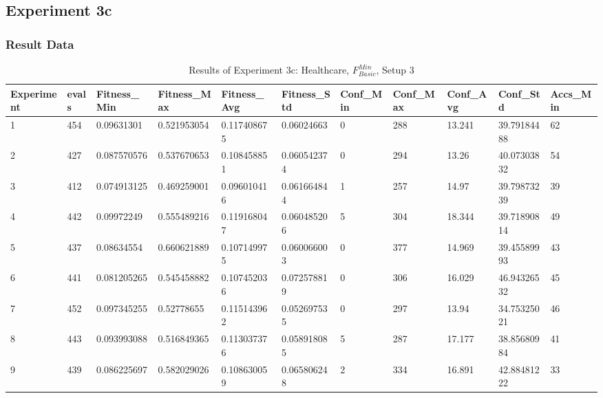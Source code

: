 	\subsection{Experiment 3c}
	\label{sec:A_Exp3c}
		\subsubsection{Result Data}
		\label{sec:A_Exp3c_Data}
		\begin{table}[H]
			\caption{Results of Experiment 3c: Healthcare, $F_{Basic}^{Min}$, Setup 3}
			\label{tab:A_Exp3c_Data}
			\begin{adjustbox}{max width=380pt,keepaspectratio,angle=90}
				\begin{tabular}{|l|l|l|l|l|l|l|l|l|l|l|}
					\hline
					\rowcolor[HTML]{EFEFEF} 
					Experiment & evals & Fitness\_Min & Fitness\_Max & Fitness\_Avg & Fitness\_Std & Conf\_Min & Conf\_Max & Conf\_Avg & Conf\_Std   & Accs\_Min \\ \hline
					1          & 454   & 0.09631301   & 0.521953054  & 0.117408675  & 0.06024663   & 0         & 288       & 13.241    & 39.79184488 & 62        \\ \hline
					2          & 427   & 0.087570576  & 0.537670653  & 0.108458851  & 0.060542374  & 0         & 294       & 13.26     & 40.07303832 & 54        \\ \hline
					3          & 412   & 0.074913125  & 0.469259001  & 0.096010416  & 0.061664844  & 1         & 257       & 14.97     & 39.79873239 & 39        \\ \hline
					4          & 442   & 0.09972249   & 0.555489216  & 0.119168047  & 0.060485206  & 5         & 304       & 18.344    & 39.71890814 & 49        \\ \hline
					5          & 437   & 0.08634554   & 0.660621889  & 0.107149975  & 0.060066003  & 0         & 377       & 14.969    & 39.45589993 & 43        \\ \hline
					6          & 441   & 0.081205265  & 0.545458882  & 0.107452036  & 0.072578819  & 0         & 306       & 16.029    & 46.94326532 & 45        \\ \hline
					7          & 452   & 0.097345255  & 0.52778655   & 0.115143962  & 0.052697535  & 0         & 297       & 13.94     & 34.75325021 & 46        \\ \hline
					8          & 443   & 0.093993088  & 0.516849365  & 0.113037376  & 0.058918085  & 5         & 287       & 17.177    & 38.85680984 & 41        \\ \hline
					9          & 439   & 0.086225697  & 0.582029026  & 0.108630059  & 0.065806248  & 2         & 334       & 16.891    & 42.88481222 & 33        \\ \hline

\end{tabular}
\end{adjustbox}
\end{table}
